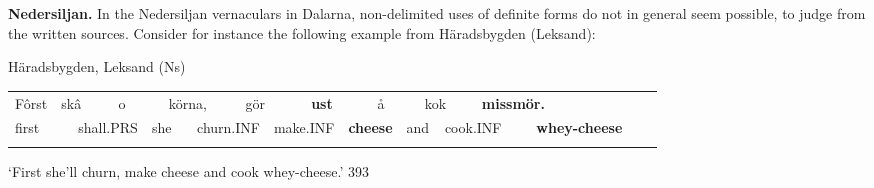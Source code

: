 \begin{styleBodytextC}
\textbf{Nedersiljan.} In the Nedersiljan vernaculars in Dalarna, non-delimited uses of definite forms do not in general seem possible, to judge from the written sources. Consider for instance the following example from Häradsbygden (Leksand):

\end{styleBodytextC}

\begin{listWWNumileveli}
\item {}

\begin{styleExample}
Häradsbygden, Leksand (Ns) 

\end{styleExample}

\end{listWWNumileveli}

\begin{tabular}{llllllllllllllllllll}
\lsptoprule
Fôrst & \multicolumn{2}{l}{skâ

} & \multicolumn{2}{l}{o

} & \multicolumn{2}{l}{körna,

} & \multicolumn{2}{l}{gör

} & \multicolumn{2}{l}{{\bfseries ust}

} & \multicolumn{2}{l}{å

} & \multicolumn{2}{l}{kok

} & \multicolumn{2}{l}{{\bfseries missmör.}

} & \multicolumn{2}{l}{} & \\
\multicolumn{2}{l}{first

} & \multicolumn{2}{l}{shall.PRS

} & \multicolumn{2}{l}{she

} & \multicolumn{2}{l}{churn.INF

} & \multicolumn{2}{l}{make.INF

} & \multicolumn{2}{l}{{\bfseries cheese}

} & \multicolumn{2}{l}{and

} & \multicolumn{2}{l}{cook.INF

} & \multicolumn{2}{l}{{\bfseries whey-cheese}

} & \multicolumn{2}{l}{}\\
\lspbottomrule
\end{tabular}

\begin{styleTranslation}
‘First she’ll churn, make cheese and cook whey-cheese.’ 393

\end{styleTranslation}


